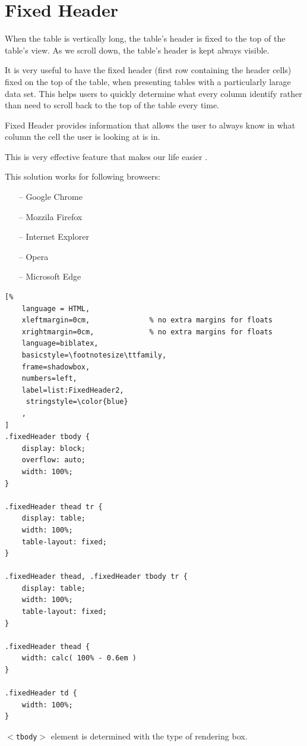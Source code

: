 \section{Fixed Header}
When the table is vertically long, the table's header is fixed to the
top of the table's view. As we scroll down, the table's header is kept
always visible.

It is very useful to have the fixed header (first row containing the
header cells) fixed on the top of the table, when presenting tables
with a particularly larage data set. This helps users to quickly
determine what every column identify rather than need to scroll back
to the top of the table every time.

Fixed Header provides information that allows the user to always know
in what column the cell the user is looking at is in.

This is very effective feature that makes our life easier
\parencite{HS}.

This solution works for following browsers:
\begin{itemize}
    \item[--] Google Chrome
    \item[--] Mozzila Firefox
    \item[--] Internet Explorer
    \item[--] Opera
    \item[--] Microsoft Edge
\end{itemize}

\begin{lstlisting}[%
    language = HTML,
    xleftmargin=0cm,              % no extra margins for floats
    xrightmargin=0cm,             % no extra margins for floats
    language=biblatex,
    basicstyle=\footnotesize\ttfamily,
    frame=shadowbox,
    numbers=left,
    label=list:FixedHeader2,
     stringstyle=\color{blue}
    ,
]
.fixedHeader tbody {
    display: block;
    overflow: auto;
    width: 100%;
}

.fixedHeader thead tr {
    display: table;
    width: 100%;
    table-layout: fixed;
}

.fixedHeader thead, .fixedHeader tbody tr {
    display: table;
    width: 100%;
    table-layout: fixed;
}

.fixedHeader thead {
    width: calc( 100% - 0.6em )
}

.fixedHeader td {
    width: 100%;
}

\end{lstlisting}

$<$\texttt{tbody}$>$ element is determined with the type of rendering
box.

